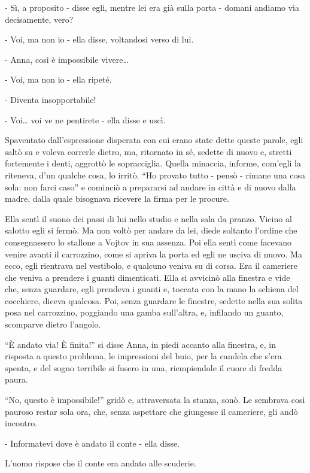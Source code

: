 - Sì, a proposito - disse egli, mentre lei era già sulla porta - domani andiamo via decisamente, vero? 

- Voi, ma non io - ella disse, voltandosi verso di lui. 

- Anna, così è impossibile vivere\ldots{} 

- Voi, ma non io - ella ripeté. 

- Diventa insopportabile! 

- Voi\ldots{} voi ve ne pentirete - ella disse e uscì. 

Spaventato dall'espressione disperata con cui erano state dette queste parole, egli saltò su e voleva correrle dietro, ma, ritornato in sé, sedette di nuovo e, stretti fortemente i denti, aggrottò le sopracciglia. Quella minaccia, informe, com'egli la riteneva, d'un qualche cosa, lo irritò. ``Ho provato tutto - pensò - rimane una cosa sola: non farci caso'' e cominciò a prepararsi ad andare in città e di nuovo dalla madre, dalla quale bisognava ricevere la firma per le procure. 

Ella sentì il suono dei passi di lui nello studio e nella sala da pranzo. Vicino al salotto egli si fermò. Ma non voltò per andare da lei, diede soltanto l'ordine che consegnassero lo stallone a Vojtov in sua assenza. Poi ella sentì come facevano venire avanti il carrozzino, come si apriva la porta ed egli ne usciva di nuovo. Ma ecco, egli rientrava nel vestibolo, e qualcuno veniva su di corsa. Era il cameriere che veniva a prendere i guanti dimenticati. Ella si avvicinò alla finestra e vide che, senza guardare, egli prendeva i guanti e, toccata con la mano la schiena del cocchiere, diceva qualcosa. Poi, senza guardare le finestre, sedette nella sua solita posa nel carrozzino, poggiando una gamba sull'altra, e, infilando un guanto, scomparve dietro l'angolo. 

``È andato via! È finita!'' si disse Anna, in piedi accanto alla finestra, e, in risposta a questo problema, le impressioni del buio, per la candela che s'era spenta, e del sogno terribile si fusero in una, riempiendole il cuore di fredda paura. 

``No, questo è impossibile!'' gridò e, attraversata la stanza, sonò. Le sembrava così pauroso restar sola ora, che, senza aspettare che giungesse il cameriere, gli andò incontro. 

- Informatevi dove è andato il conte - ella disse. 

L'uomo rispose che il conte era andato alle scuderie. 

